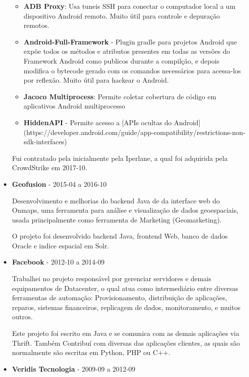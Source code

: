 \documentclass[a4paper,10pt]{article}
\begin{document}
\begin{itemize}
        \begin{itemize}
          \item \textbf{ADB Proxy}: Usa tuneis SSH para conectar o computador local a um dispositivo Android remoto. Muito útil para controle e depuração remotos.
          \item \textbf{Android-Full-Framework} - Plugin gradle para projetos Android que expõe todos os métodos e atributos presentes em todas as versões do Framework Android como publicos durante a compilção, e depois modifica o bytecode gerado com os comandos necessários para acessa-los por reflexão. Muito útil para hackear o Android.
          \item \textbf{Jacoco Multiprocess}: Permite coletar cobertura de código em aplicativos Android multiprocesso
          \item \textbf{HiddenAPI} - Permite acesso a [APIs ocultas do Android](https://developer.android.com/guide/app-compatibility/restrictions-non-sdk-interfaces)
        \end{itemize}

        Fui contratado pela inicialmente pela Iperlane, a qual foi adquirida pela CrowdStrike em 2017-10.

      \item
        \textbf{Geofusion} - 2015-04 a 2016-10

        Desenvolvimento e melhorias do backend Java de da interface web do Onmaps, uma ferramenta para análise e visualização de dados geoespaciais, usada principalmente como ferramenta de Marketing (Geomarketing).
        
        O projeto foi desenvolvido backend Java, frontend Web, banco de dados Oracle e indice espacial em Solr.

      \item
        \textbf{Facebook} - 2012-10 a 2014-09
        
        Trabalhei no projeto responsável por gerenciar servidores e demais equipamentos de Datacenter, o qual atua como intermediário entre diversas ferramentas de automação: Provisionamento, distribuição de aplicações, reparos, sistemas financeiros, replicagem de dados, monitoramento, e muitos outros.
        
        Este projeto foi escrito em Java e se comunica com as demais aplicações via Thrift. Também Contribuí com diversas das aplicações clientes, as quais são normalmente são escritas em Python, PHP ou C++.

      \item
        \textbf{Veridis Tecnologia} - 2009-09 a 2012-09


\end{itemize}
\end{document}
